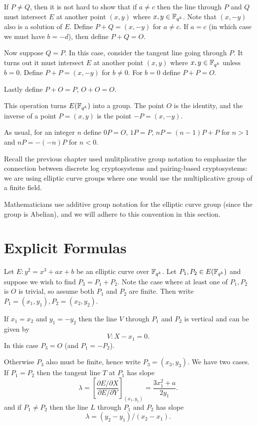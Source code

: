 If $P \ne Q$, then it is not hard to show that if $a \ne c$
then the line through $P$ and $Q$ must intersect $E$ at another point
$(x,y)$ where $x, y\in \mathbb{F}_{q^k}$. Note that $(x,-y)$ also is a solution of $E$.
Define $P + Q = (x, -y)$ for $a \ne c$.
If $a = c$ (in which case we must have $b = -d$),
then define $P + Q = O$.

Now suppose $Q = P$. In this case, consider the tangent line going through
$P$. It turns out it must intersect $E$ at another point $(x,y)$ where
$x,y\in\mathbb{F}_{q^k}$ unless $b = 0$. Define $P + P = (x, -y)$ for $b \ne 0$.
For $b = 0$ define $P + P = O$.

Lastly define $P + O = P$, $O + O = O$.

This operation turns $E(\mathbb{F}_{q^k})$ into a group.
The point $O$ is the identity, and the inverse
of a point $P = (x,y)$ is the point $-P = (x,-y)$.

As usual, for an integer $n$ define $0 P = O$, $1 P = P$,
$n P = (n-1)P + P$ for $n > 1$ and $n P = -(-n)P$ for $n < 0$.

Recall the previous chapter used mulitplicative group notation to emphasize
the connection
between discrete log cryptosystems and pairing-based cryptosystems:
we are using elliptic curve groups where one would use
the multiplicative group of a finite field.

Mathematicians use additive group notation for the elliptic curve group
(since the group is Abelian), and we will adhere to this convention in this
section.

\section {Explicit Formulas}

Let $E: y^2 = x^3 + ax + b$ be an elliptic curve over $\mathbb{F}_{q^k}$. Let
$P_1, P_2 \in E(\mathbb{F}_{q^k})$ and suppose
we wish to find $P_3 = P_1 + P_2$.
Note the case where at least one of $P_1, P_2$ is $O$ is trivial,
so assume both $P_1$ and $P_2$ are finite.
Then write $P_1 = (x_1, y_1), P_2 = (x_2, y_2)$.

If $x_1 = x_2$ and $y_1 = -y_2$
then the line $V$ through $P_1$ and $P_2$ is vertical and
can be given by
\[ V : X - x_1 = 0  . \]
In this case $P_3 = O$ (and $P_1 = -P_2$).

Otherwise $P_3$ also must be finite, hence write $P_3 = (x_3, y_3)$.
We have two cases. If $P_1 = P_2$ then the tangent line $T$ at
$P_1$
has slope
\[\lambda =
\left[ \frac{\partial E / \partial X}{\partial E/ \partial Y} \right]_{(x_1,y_1)}
= \frac{3x_1^2 + a}{2y_1} . \]
and if $P_1 \ne P_2$ then the line $L$ through $P_1$ and $P_2$ has slope
\[ \lambda = (y_2 - y_1)/(x_2 - x_1) . \]

